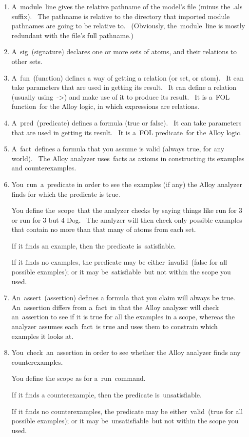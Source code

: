 \documentclass[oneside]{book}
\begin{document}
\begin{enumerate}
\item A~module~line gives the relative pathname of the model's file (minus the {\textquotedbl}.als{\textquotedbl} suffix).~ The pathname is relative to the directory that imported module pathnames are going to be relative to.~ (Obviously, the~module~line is mostly redundant with the file's full pathname.)~
\item A~sig~(signature) declares one or more sets of atoms, and their relations to other sets.~
\item A~fun~(function) defines a way of getting a relation (or set, or atom).~ It can take parameters that are used in getting its result.~ It can define a relation (usually using~-{\textgreater}) and make use of it to produce its result.~ It is a~FOL function~for the Alloy logic, in which expressions are relations.~
\item A~pred~(predicate) defines a formula (true or false).~ It can take parameters that are used in getting its result.~ It is a~FOL predicate~for the Alloy logic.~
\item A~fact~defines a formula that you assume is valid (always true, for any world).~ The Alloy analyzer uses~facts as axioms in constructing its examples and counterexamples.~
\item You~run~a~predicate in order to see the examples (if any) the Alloy analyzer finds for which the predicate is true.~

You define the~scope~that the analyzer checks by saying things like {\textquotedbl}run for 3{\textquotedbl} or {\textquotedbl}run for 3 but 4 Dog{\textquotedbl}.~ The analyzer will then check only possible examples that contain no more than that many of atoms from each set.~

If it finds an example, then the predicate is~satisfiable.~

If it finds no examples, the predicate may be either~invalid~(false for all possible examples); or it may be~satisfiable~but not within the scope you used.~
\item An~assert~(assertion) defines a formula that you claim will always be true.~ An~assertion differs from a~fact~in that the Alloy analyzer will check an~assertion to see if it is true for all the examples in a scope, whereas the analyzer assumes each~fact~is true and uses them to constrain which examples it looks at.~
\item You~check~an~assertion in order to see whether the Alloy analyzer finds any counterexamples.~

You define the scope as for a~run~command.~

If it finds a counterexample, then the predicate is~unsatisfiable.~

If it finds no counterexamples, the predicate may be either~valid~(true for all possible examples); or it may be~unsatisfiable~but not within the scope you used.~
\end{enumerate}
\end{document}
